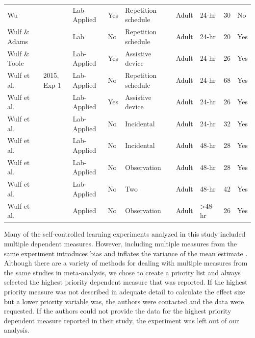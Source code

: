 \documentclass[man,floatsintext,hidelinks]{apa7}
\begin{document}
\begin{landscape}
\begin{longtable}[l]{lllllllll}
Wu                    & \citeyear[Exp 1]{wu2007self}    & Lab-Applied & Yes          & Repetition schedule   & Adult        & 24-hr              & 30  & No        \\
Wulf \& Adams         & \citeyear{Wulf2014-sn}           & Lab         & No           & Repetition schedule   & Adult        & 24-hr              & 20  & Yes       \\
Wulf \& Toole         & \citeyear{Wulf1999-pn}           & Lab-Applied & Yes          & Assistive device      & Adult        & 24-hr              & 26  & Yes       \\
Wulf et al.           & 2015, Exp 1    & Lab-Applied & No           & Repetition schedule   & Adult        & 24-hr              & 68  & Yes       \\
Wulf et al.           & \citeyear{Wulf2001-nb}           & Lab-Applied & Yes          & Assistive device      & Adult        & 24-hr              & 26  & Yes       \\
Wulf et al.           & \citeyear[Exp 1]{Wulf2018-ie}    & Lab-Applied & No           & Incidental            & Adult        & 24-hr              & 32  & Yes       \\
Wulf et al.           & \citeyear[Exp 2]{Wulf2018-ie}   & Lab-Applied & No           & Incidental            & Adult        & 48-hr              & 28  & Yes       \\
Wulf et al.           & \citeyear[Exp 2]{Wulf2018-ie}  & Lab-Applied & No           & Observation           & Adult        & 48-hr              & 28  & Yes       \\
Wulf et al.           & \citeyear[Exp 2]{Wulf2018-ie}   & Lab-Applied & No           & Two                   & Adult        & 48-hr              & 42  & Yes       \\
Wulf et al.           & \citeyear{Wulf2005-sz}           & Applied     & No           & Observation           & Adult        & \textgreater 48-hr & 26  & Yes       \\
\hline
\end{longtable}
\end{landscape}

\normalsize

Many of the self-controlled learning experiments analyzed in this study included multiple dependent measures. However, including multiple measures from the same experiment introduces bias and inflates the variance of the mean estimate \parencite{Scammacca2014-do}. Although there are a variety of methods for dealing with multiple measures from the same studies in meta-analysis, we chose to create a priority list and always selected the highest priority dependent measure that was reported. If the highest priority measure was not described in adequate detail to calculate the effect size but a lower priority variable was, the authors were contacted and the data were requested. If the authors could not provide the data for the highest priority dependent measure reported in their study, the experiment was left out of our analysis.
\end{document}
